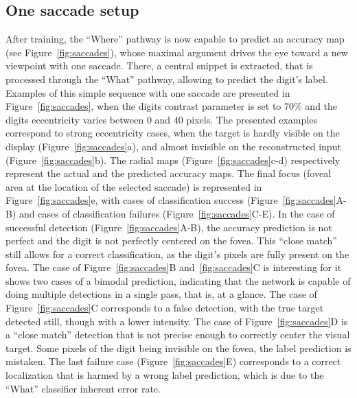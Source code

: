 \subsection{One saccade setup}
After training, the ``Where'' pathway is now capable to predict an accuracy map (see Figure~\ref{fig:saccades}), whose maximal argument drives the eye toward a new viewpoint with one saccade. There, a central snippet is extracted, that is processed through the ``What'' pathway, allowing to predict the digit's label. Examples of this simple sequence with one saccade are presented in Figure~\ref{fig:saccades}, when the digits contrast parameter is set to $70\%$ and the digits eccentricity varies between $0$ and $40$ pixels. The presented examples correspond to strong eccentricity cases, when the target is hardly visible on the display (Figure~\ref{fig:saccades}a), and almost invisible on the reconstructed input (Figure~\ref{fig:saccades}b). The radial maps (Figure~\ref{fig:saccades}c-d) respectively represent the actual and the predicted accuracy maps. The final focus (foveal area at the location of the selected saccade) is represented in Figure~\ref{fig:saccades}e, with cases of classification success (Figure~\ref{fig:saccades}A-B) and cases of classification failures (Figure~\ref{fig:saccades}C-E). In the case of successful detection (Figure~\ref{fig:saccades}A-B), the accuracy prediction is not perfect and the digit is not perfectly centered on the fovea. This ``close match'' still allows for a correct classification, as the digit's pixels are fully present on the fovea. The case of Figure~\ref{fig:saccades}B and~\ref{fig:saccades}C is interesting for it shows two cases of a bimodal prediction, indicating that the network is capable of doing multiple detections in a single pass, that is, at a glance. The case of Figure~\ref{fig:saccades}C corresponds to a false detection, with the true target detected still, though with a lower intensity. The case of Figure~\ref{fig:saccades}D is a ``close match'' detection that is not precise enough to correctly center the visual target. Some pixels of the digit being invisible on the fovea, the label prediction is mistaken. The last failure case (Figure~\ref{fig:saccades}E) corresponds to a correct localization that is harmed by a wrong label prediction, which is due to the ``What'' classifier inherent error rate. %


